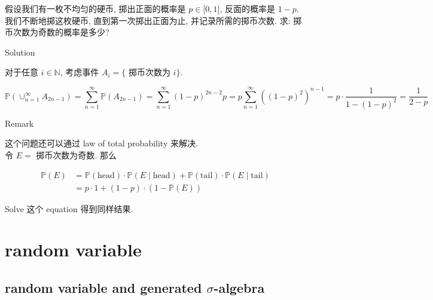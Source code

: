 \documentclass{qlnotes-export}
\begin{document}
\begin{example}\label{ex-01-combinatorics-prob-space-coin-tossing}

假设我们有一枚不均匀的硬币, 掷出正面的概率是 \(p \in \lbrack 0,1\rbrack\), 反面的概率是 \(1 - p\). 我们不断地掷这枚硬币, 直到第一次掷出正面为止, 并记录所需的掷币次数. 求: 掷币次数为奇数的概率是多少?

\begin{qlsolution}{Solution}

对于任意 \(i \in {\mathbb{N}}\), 考虑事件 \(A_{i} = \{\) 掷币次数为 \(i\}\).

\[{\mathbb{P}}\left( {\cup_{n = 1}^{\infty}A_{2n - 1}} \right) = \sum\limits_{n = 1}^{\infty}{\mathbb{P}}\left( A_{2n - 1} \right) = \sum\limits_{n = 1}^{\infty}(1 - p)^{2n - 2}p = p\sum\limits_{n = 1}^{\infty}\left( {(1 - p)^{2}} \right)^{n - 1} = p \cdot \frac{1}{1 - (1 - p)^{2}} = \frac{1}{2 - p}\]

\end{qlsolution}

\begin{qlremark}{Remark}

这个问题还可以通过 law of total probability 来解决.\\
令 \(E =\) 掷币次数为奇数. 那么

\[\begin{matrix}
{{\mathbb{P}}(E)} & {= {\mathbb{P}}(\text{head}) \cdot {\mathbb{P}}(E \mid \text{head}) + {\mathbb{P}}(\text{tail}) \cdot {\mathbb{P}}(E \mid \text{tail})} \\
 & {= p \cdot 1 + (1 - p) \cdot (1 - {\mathbb{P}}(E))}
\end{matrix}\]

Solve 这个 equation 得到同样结果.

\end{qlremark}

\end{example}

\chapter{random variable}\label{random-variable}

\section{\texorpdfstring{random variable and generated \(\sigma\)-algebra}{random variable and generated \textbackslash sigma-algebra}}\label{random-variable-and-generated-sigma-algebra}
\end{document}
